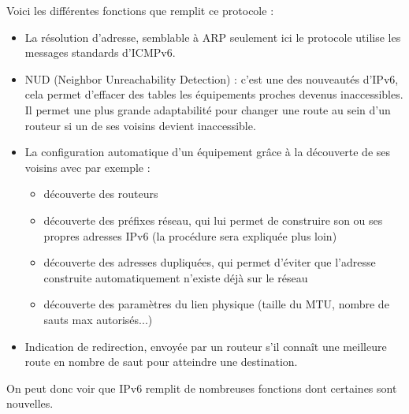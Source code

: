 Voici les différentes fonctions que remplit ce protocole :
\begin{itemize}
  \item La résolution d’adresse, semblable à ARP seulement ici le protocole utilise les messages standards d’ICMPv6.
  \item NUD (Neighbor Unreachability Detection) : c’est une des nouveautés d’IPv6, cela permet d’effacer des tables les équipements proches devenus inaccessibles. Il permet une plus grande adaptabilité pour changer une route au sein d’un routeur si un de ses voisins devient inaccessible.
  \item La configuration automatique d’un équipement grâce à la découverte de ses voisins avec par exemple :
    \begin{itemize}
      \item découverte des routeurs
      \item découverte des préfixes réseau, qui lui permet de construire son ou ses propres adresses IPv6 (la procédure sera expliquée plus loin)
      \item découverte des adresses dupliquées, qui permet d’éviter que l’adresse construite automatiquement n’existe déjà sur le réseau
      \item découverte des paramètres du lien physique (taille du MTU, nombre de sauts max autorisés...)
    \end{itemize}
  \item	Indication de redirection, envoyée par un routeur s’il connaît une meilleure route en nombre de saut pour atteindre une destination.
\end{itemize}On peut donc voir que IPv6 remplit de nombreuses fonctions dont certaines sont nouvelles.

